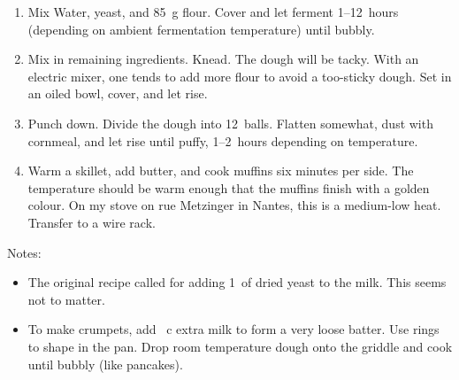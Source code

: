 
\begin{ingredients}
\end{ingredients}


\begin{recipe}
  \begin{enumerate}

  \item Mix Water, yeast, and 85~g flour.  Cover and let ferment
    1--12~hours (depending on ambient fermentation temperature) until
    bubbly.

  \item Mix in remaining ingredients.  Knead.  The dough will be
    tacky.  With an electric mixer, one tends to add more flour to
    avoid a too-sticky dough.  Set in an oiled bowl, cover, and let
    rise.

  \item Punch down.  Divide the dough into 12~balls.  Flatten
    somewhat, dust with cornmeal, and let rise until puffy, 1--2~hours
    depending on temperature.
    
  \item Warm a skillet, add butter, and cook muffins six minutes per
    side.  The temperature should be warm enough that the muffins
    finish with a golden colour.  On my stove on rue Metzinger in
    Nantes, this is a medium-low heat.  Transfer to a wire rack.

  \end{enumerate}
\end{recipe}

Notes:
\begin{itemize}
\item The original recipe called for adding 1~\tsp of dried yeast to
  the milk.  This seems not to matter.
\item To make crumpets, add \fracQQ~c extra milk to form a very loose
  batter.  Use rings to shape in the pan.  Drop room temperature dough
  onto the griddle and cook until bubbly (like pancakes).
\end{itemize}


